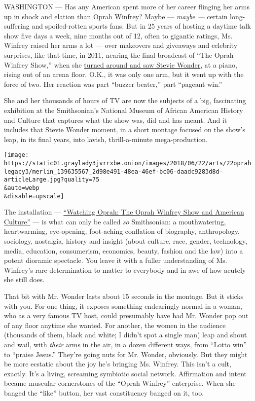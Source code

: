 WASHINGTON --- Has any American spent more of her career flinging her
arms up in shock and elation than Oprah Winfrey? Maybe --- \emph{maybe
---} certain long-suffering and spoiled-rotten sports fans. But in 25
years of hosting a daytime talk show five days a week, nine months out
of 12, often to gigantic ratings, Ms. Winfrey raised her arms a lot ---
over makeovers and giveaways and celebrity surprises, like that time, in
2011, nearing the final broadcast of ``The Oprah Winfrey Show,'' when
she \href{https://www.youtube.com/watch?v=Le4eqSw6GMY}{turned around and
saw Stevie Wonder}, at a piano, rising out of an arena floor. O.K., it
was only one arm, but it went up with the force of two. Her reaction was
part ``buzzer beater,'' part ``pageant win.''

She and her thousands of hours of TV are now the subjects of a big,
fascinating exhibition at the Smithsonian's National Museum of African
American History and Culture that captures what the show was, did and
has meant. And it includes that Stevie Wonder moment, in a short montage
focused on the show's leap, in its final years, into lavish,
thrill-a-minute mega-production.

\texttt{[image: https://static01.graylady3jvrrxbe.onion/images/2018/06/22/arts/22oprahlegacy3/merlin\_139635567\_2d98e491-48ea-46ef-bc06-daadc9283d8d-articleLarge.jpg?quality=75\\\&auto=webp\\\&disable=upscale]}

The installation ---
\href{https://nmaahc.si.edu/explore/exhibitions/watchingoprah}{``Watching
Oprah: The Oprah Winfrey Show and American Culture''} --- is what can
only be called \emph{so} Smithsonian: a mouthwatering, heartwarming,
eye-opening, foot-aching conflation of biography, anthropology,
sociology, nostalgia, history and insight (about culture, race, gender,
technology, media, education, consumerism, economics, beauty, fashion
and the law) into a potent dioramic spectacle. You leave it with a
fuller understanding of Ms. Winfrey's rare determination to matter to
everybody and in awe of how acutely she still does.

That bit with Mr. Wonder lasts about 15 seconds in the montage. But it
sticks with you. For one thing, it exposes something endearingly normal
in a woman, who as a very famous TV host, could presumably have had Mr.
Wonder pop out of any floor anytime she wanted. For another, the women
in the audience (thousands of them, black and white; I didn't spot a
single man) leap and shout and wail, with \emph{their} arms in the air,
in a dozen different ways, from ``Lotto win'' to ``praise Jesus.''
They're going nuts for Mr. Wonder, obviously. But they might be more
ecstatic about the joy he's bringing Ms. Winfrey. This isn't a cult,
exactly. It's a living, screaming symbiotic social network. Affirmation
and intent became muscular cornerstones of the ``Oprah Winfrey''
enterprise. When she banged the ``like'' button, her vast constituency
banged on it, too.

